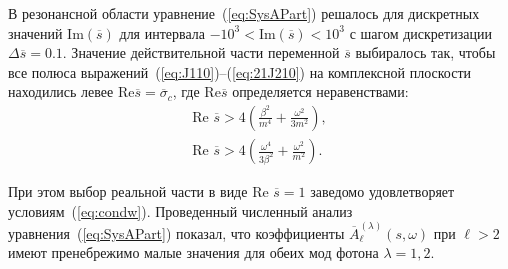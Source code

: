 \documentclass[14pt, russian]{article}
\begin{document}
В резонансной области уравнение~(\ref{eq:SysAPart}) решалось для дискретных значений $\textrm{Im}(\overline{s})$ для интервала $-10^3<\textrm{Im}(\overline{s})<10^3$ с шагом дискретизации $\Delta \overline{s}=0.1$. Значение действительной части переменной $\overline{s}$ выбиралось так, чтобы все полюса выражений~(\ref{eq:J110})--(\ref{eq:21J210}) на комплексной плоскости находились левее $\text{Re} \overline{s}=\overline{\sigma}_c$, где $\text{Re} \overline{s}$ определяется неравенствами:
\begin{equation}\begin{gathered}\label{eq:condw}
		\textrm{Re }\overline{s}>4\left(\frac{\beta^2}{m^4}+\frac{\omega^2}{3m^2}\right),\\
		\textrm{Re }\overline{s}>4 \left(\frac{\omega^4}{3\beta^2 } + \frac{\omega^2}{m^2}\right).
	\end{gathered}	
\end{equation}

При этом выбор реальной части в виде $\textrm{Re }\overline{s}=1$ заведомо удовлетворяет условиям~(\ref{eq:condw}).
Проведенный численный анализ уравнения~(\ref{eq:SysAPart}) показал, что коэффициенты $\overline{A}^{(\lambda)}_\ell(s,\omega)$ при $\ell>2$ имеют пренебрежимо малые значения для обеих мод фотона $\lambda=1,2$.
\end{document}
